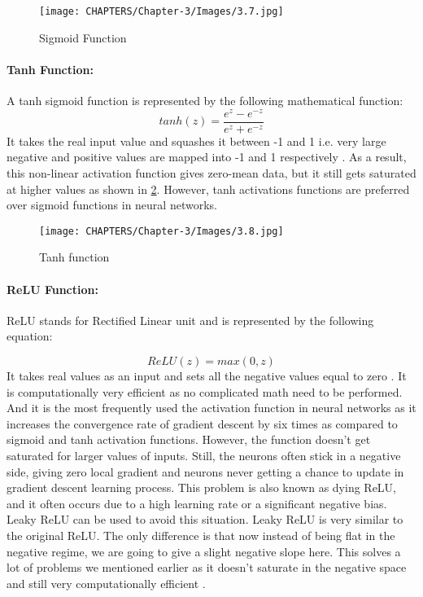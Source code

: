 \begin{figure}[H]
    \centering
        \texttt{[image: CHAPTERS/Chapter-3/Images/3.7.jpg]}
    \caption{Sigmoid Function}
    \label{fig:3.7}
\end{figure}
\paragraph*{Tanh Function:}
A tanh sigmoid function is represented by the following mathematical function:
\begin{equation}
    tanh(z) = \frac{e^{z}-e^{-z}}{e^{z}+e^{-z}}
\end{equation}
It takes the real input value and squashes it between -1 and 1 i.e. very 
large negative and positive values are mapped into -1 and 1 respectively \cite{chap_3_article:5}. As 
a result, this non-linear activation function gives zero-mean data, but it 
still gets saturated at higher values as shown in \ref{fig:3.8}. However, tanh 
activations functions are preferred over sigmoid functions in neural networks.

\begin{figure}[H]
    \centering
        \texttt{[image: CHAPTERS/Chapter-3/Images/3.8.jpg]}
    \caption{Tanh function}
    \label{fig:3.8}
\end{figure}

\paragraph*{ReLU Function:}
ReLU stands for Rectified Linear unit and is represented by the following equation:

\begin{equation}
    ReLU(z) = max(0,z)
\end{equation}
It takes real values as an input and sets all the negative values equal to zero \cite{chap_3_article:3}. It is computationally very efficient as no complicated math need to be performed. And it is the most frequently used the activation function in neural networks as it increases the convergence rate of gradient descent by six times as compared to sigmoid and tanh activation 
functions. However, the function doesn’t get saturated for larger values of inputs. Still, the neurons often stick in a negative side, giving zero local gradient and neurons never getting a chance to update in gradient descent learning process. 
This problem is also known as dying ReLU, and it often occurs due to a high learning rate or a significant negative bias. Leaky ReLU can be used to avoid this situation. Leaky ReLU is very similar to the original ReLU. The only difference is that now instead of being flat in the negative regime, we are going to give a slight negative slope here. This solves a lot of problems we mentioned earlier
as it doesn’t saturate in the negative space and still very computationally efficient \cite{chap_3_article:3}.

